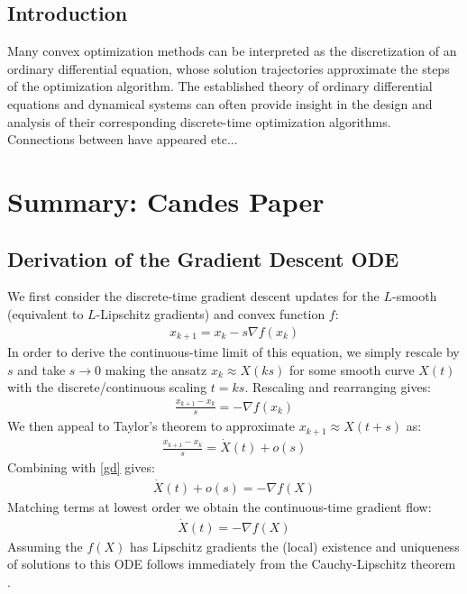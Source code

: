 

\subsection{Introduction}
Many convex optimization methods can be interpreted as the discretization of an ordinary differential equation, whose solution trajectories approximate the steps of the optimization algorithm. The established theory of ordinary differential equations and dynamical systems can often provide insight in the design and analysis of their corresponding discrete-time optimization algorithms. Connections between have appeared etc... 

\section{Summary: Candes Paper}
\subsection{Derivation of the Gradient Descent ODE}
We first consider the discrete-time gradient descent updates for the $L$-smooth (equivalent to $L$-Lipschitz gradients) and convex function $f$:
\begin{align*}
    x_{k+1} = x_k - s \nabla f(x_k) 
\end{align*}
In order to derive the continuous-time limit of this equation, we simply rescale by $s$ and take $s \to 0$ making the ansatz $x_k \approx X(ks)$ for some smooth curve $X(t)$ with the discrete/continuous scaling $t=ks$. Rescaling and rearranging gives:
\begin{align}
    \frac{x_{k+1} - x_k}{s} = - \nabla f(x_k) \label{gd}
\end{align}
We then appeal to Taylor's theorem to approximate $x_{k+1} \approx X(t+s)$ as:
\begin{align*}
    \frac{x_{k+1} - x_k}{s} = \dot{X}(t) + o(s)
\end{align*}
Combining with \eqref{gd} gives:
\begin{align*}
    \dot{X}(t) + o(s) = - \nabla f(X)
\end{align*}
Matching terms at lowest order we obtain the continuous-time gradient flow:
\begin{align}
    \dot{X}(t) = -\nabla f(X) \label{gdode}
\end{align}
Assuming the $f(X)$ has Lipschitz gradients the (local) existence and uniqueness of solutions to this ODE follows immediately from the Cauchy-Lipschitz theorem \cite{teschl2012ordinary}.
